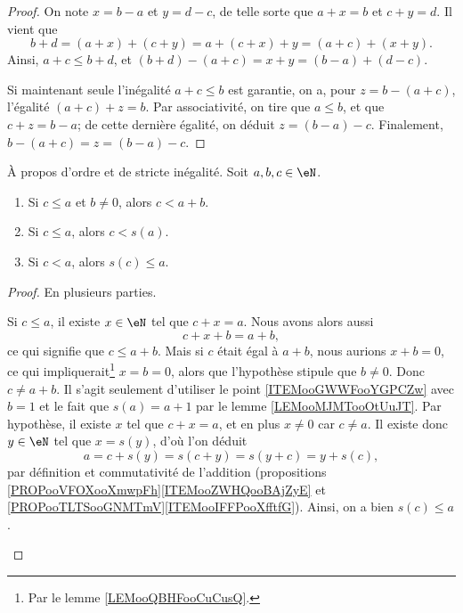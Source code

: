 \begin{proof}
	On note \( x = b - a \) et \( y = d - c \), de telle sorte que \( a + x = b \) et \( c + y = d \). Il vient que
 	\begin{equation}
  		b + d = (a + x) + (c + y) = a + (c + x) + y = (a + c) + (x + y).
  	\end{equation}
   	Ainsi,  \( a + c \leq b + d \), et \( (b + d) - (a + c) = x + y = (b - a) + (d - c) \).

 	Si maintenant seule l'inégalité \( a + c \leq b \) est garantie, on a, pour \( z = b - (a+c) \), l'égalité \( (a + c) + z = b \). Par associativité, on tire que \( a \leq b \), et que \( c + z = b - a \); de cette dernière égalité, on déduit \( z = (b - a) - c \). Finalement, \(  b - (a+c) = z = (b - a) - c \).
  \end{proof}


\begin{lemma}       \label{LEMooPVRQooXPMKTt}
	À propos d'ordre et de stricte inégalité. Soit \( a, b, c \in \eN \).
	\begin{enumerate}
		\item       \label{ITEMooGWWFooYGPCZw}
		      Si \( c\leq a\) et \( b\neq 0\), alors \( c<a+b\).
		\item       \label{ITEMooRWGWooAfkrri}
		      Si \( c\leq a\), alors \( c<s(a)\).
		\item       \label{ITEMooWCOIooMWrCag}
		      Si \( c<a\), alors \( s(c)\leq a\).
	\end{enumerate}
\end{lemma}

\begin{proof}
	En plusieurs parties.
	\begin{subproof}
		Si \( c\leq a\), il existe \( x\in \eN\) tel que \( c+x=a\). Nous avons alors aussi
		\begin{equation}
			c+x+b=a+b,
		\end{equation}
		ce qui signifie que \( c\leq a+b\). Mais si \( c\) était égal à \( a+b\), nous aurions \( x+b=0\), ce qui impliquerait\footnote{Par le lemme \ref{LEMooQBHFooCuCusQ}.} \( x=b=0\), alors que l'hypothèse stipule que \( b\neq 0\). Donc \( c\neq a+b\).
		Il s'agit seulement d'utiliser le point \ref{ITEMooGWWFooYGPCZw} avec \( b=1\) et le fait que \( s(a)=a+1\) par le lemme \ref{LEMooMJMTooOtUuJT}.
		Par hypothèse, il existe \( x \) tel que \( c+x=a\), et en plus \( x \neq 0 \) car \( c \neq a\). Il existe donc \( y\in \eN\) tel que \( x=s(y)\), d'où l'on déduit
		\begin{equation}
			a = c + s(y) = s(c + y) = s(y + c) = y + s(c),
		\end{equation}
		par définition et commutativité de l'addition (propositions \ref{PROPooVFOXooXmwpFh}\ref{ITEMooZWHQooBAjZyE} et \ref{PROPooTLTSooGNMTmV}\ref{ITEMooIFFPooXfftfG}).
		Ainsi, on a bien \( s(c)\leq a\).
	\end{subproof}
\end{proof}


